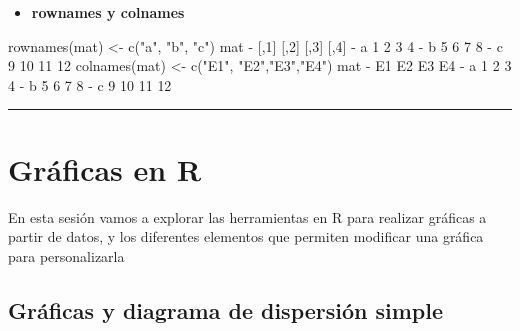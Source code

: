 \documentclass[
]{book}
\newenvironment{Shaded}{\begin{snugshade}}{\end{snugshade}}
\newcommand{\DecValTok}[1]{\textcolor[rgb]{0.00,0.00,0.81}{#1}}
\newcommand{\FunctionTok}[1]{\textcolor[rgb]{0.00,0.00,0.00}{#1}}
\newcommand{\NormalTok}[1]{#1}
\newcommand{\OtherTok}[1]{\textcolor[rgb]{0.56,0.35,0.01}{#1}}
\newcommand{\SpecialCharTok}[1]{\textcolor[rgb]{0.00,0.00,0.00}{#1}}
\newcommand{\StringTok}[1]{\textcolor[rgb]{0.31,0.60,0.02}{#1}}
\providecommand{\tightlist}{%
  \setlength{\itemsep}{0pt}\setlength{\parskip}{0pt}}
\begin{document}
\begin{itemize}
\tightlist
\item
  \textbf{rownames y colnames}
\end{itemize}

\begin{Shaded}
\begin{Highlighting}[]
\FunctionTok{rownames}\NormalTok{(mat) }\OtherTok{\textless{}{-}} \FunctionTok{c}\NormalTok{(}\StringTok{"a"}\NormalTok{, }\StringTok{"b"}\NormalTok{, }\StringTok{"c"}\NormalTok{)}
\NormalTok{mat}
\SpecialCharTok{{-}}\NormalTok{   [,}\DecValTok{1}\NormalTok{] [,}\DecValTok{2}\NormalTok{] [,}\DecValTok{3}\NormalTok{] [,}\DecValTok{4}\NormalTok{]}
\SpecialCharTok{{-}}\NormalTok{ a    }\DecValTok{1}    \DecValTok{2}    \DecValTok{3}    \DecValTok{4}
\SpecialCharTok{{-}}\NormalTok{ b    }\DecValTok{5}    \DecValTok{6}    \DecValTok{7}    \DecValTok{8}
\SpecialCharTok{{-}}\NormalTok{ c    }\DecValTok{9}   \DecValTok{10}   \DecValTok{11}   \DecValTok{12}
\FunctionTok{colnames}\NormalTok{(mat) }\OtherTok{\textless{}{-}} \FunctionTok{c}\NormalTok{(}\StringTok{"E1"}\NormalTok{, }\StringTok{"E2"}\NormalTok{,}\StringTok{"E3"}\NormalTok{,}\StringTok{"E4"}\NormalTok{)}
\NormalTok{mat}
\SpecialCharTok{{-}}\NormalTok{   E1 E2 E3 E4}
\SpecialCharTok{{-}}\NormalTok{ a  }\DecValTok{1}  \DecValTok{2}  \DecValTok{3}  \DecValTok{4}
\SpecialCharTok{{-}}\NormalTok{ b  }\DecValTok{5}  \DecValTok{6}  \DecValTok{7}  \DecValTok{8}
\SpecialCharTok{{-}}\NormalTok{ c  }\DecValTok{9} \DecValTok{10} \DecValTok{11} \DecValTok{12}
\end{Highlighting}
\end{Shaded}

\begin{center}\rule{0.5\linewidth}{0.5pt}\end{center}

\hypertarget{gruxe1ficas-en-r}{%
\chapter{Gráficas en R}\label{gruxe1ficas-en-r}}

En esta sesión vamos a explorar las herramientas en R para realizar gráficas a partir de datos, y los diferentes elementos que permiten modificar una gráfica para personalizarla

\hypertarget{gruxe1ficas-y-diagrama-de-dispersiuxf3n-simple}{%
\section{Gráficas y diagrama de dispersión simple}\label{gruxe1ficas-y-diagrama-de-dispersiuxf3n-simple}}
\end{document}
